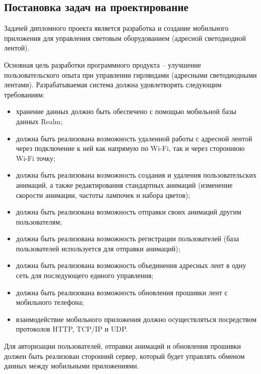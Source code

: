 \subsection{Постановка задач на проектирование}
\label{sec:develop:task}

Задачей дипломного проекта является разработка и создание мобильного приложения для управления световым оборудованием (адресной светодиодной лентой). 

Основная цель разработки программного продукта – улучшение пользовательского опыта при управлении гирляндами (адресными светодиодными лентами).
Разрабатываемая система должна удовлетворять следующим требованиям:
\begin{itemize}
	\item хранение данных должно быть обеспечено с помощью мобильной базы данных Realm;
	\item должна быть реализована возможность удаленной работы с адресной лентой через подключение к ней как напрямую по Wi-Fi, так и через стороннюю Wi-Fi точку;
	\item должна быть реализована возможность создания и удаления пользовательских анимаций, а также редактирования стандартных анимаций (изменение скорости анимации, частоты лампочек и набора цветов);
	\item должна быть реализована возможность отправки своих анимаций другим пользователям;
	\item должна быть реализована возможность регистрации пользователей (база пользователей используется для отправки анимаций);
	\item должна быть реализована возможность объединения адресных лент в одну сеть для последующего единого управления;
	\item должна быть реализована возможность обновления прошивки лент с мобильного телефона;
	\item взаимодействие мобильного приложения должно осуществляться посредством протоколов HTTP, TCP/IP и UDP.
\end{itemize}

Для авторизации пользователей, отправки анимаций и обновления прошивки должен быть реализован сторонний сервер, который будет управлять обменом данных между мобильными приложениями.
